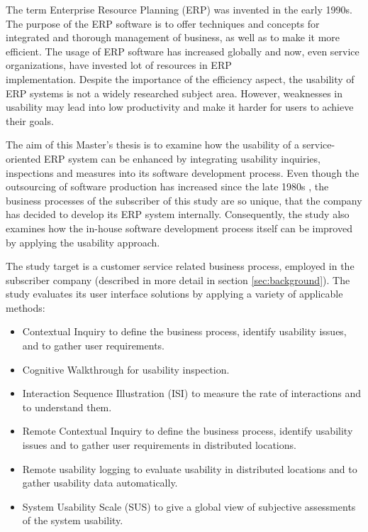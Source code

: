 \documentclass[12pt,a4paper,oneside,pdftex]{report}
\begin{document}
The term Enterprise Resource Planning (ERP) was invented in the early 1990s.\citep{RefWorks:3} The purpose of the ERP software is to offer techniques and concepts for integrated and thorough management of business, as well as to make it more efficient.
The usage of ERP software has increased globally and now, even service organizations, have invested lot of resources in ERP \\  implementation.\citep{RefWorks:1, RefWorks:7} Despite the importance of the efficiency aspect, the usability of ERP systems is not a widely researched subject area. However, weaknesses in usability may lead into low productivity and make it harder for users to achieve their goals.\citep{RefWorks:2} 

The aim of this Master's thesis is to examine how the usability of a service-oriented ERP system can be enhanced by integrating usability inquiries, inspections and measures into its software development process. Even though the outsourcing of software production has increased since the late 1980s \citep{RefWorks:38}, the business processes of the subscriber of this study are so unique, that the company has decided to develop its ERP system internally. Consequently, the study also examines how the in-house software development process itself can be improved by applying the usability approach.


The study target is a customer service related business process, employed in the subscriber company (described in more detail in section \ref{sec:background}). The study evaluates its user interface solutions by applying a variety of applicable methods:
\begin{itemize}
\item Contextual Inquiry to define the business process, identify usability issues, and to gather user requirements.
\item Cognitive Walkthrough for usability inspection.
\item Interaction Sequence Illustration (ISI) to measure the rate of interactions and to understand them.
\item Remote Contextual Inquiry to define the business process, identify usability issues and to gather user requirements in distributed locations.
\item Remote usability logging to evaluate usability in distributed locations and to gather usability data automatically.
\item System Usability Scale (SUS) to give a global view of subjective assessments of the system usability.
\end{itemize}
\end{document}

